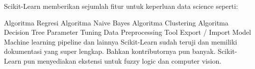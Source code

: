 \begin{enumerate}
Scikit-Learn memberikan sejumlah fitur untuk keperluan data science seperti:

Algoritma Regresi
Algoritma Naive Bayes
Algoritma Clustering
Algoritma Decision Tree
Parameter Tuning
Data Preprocessing Tool
Export / Import Model
Machine learning pipeline
dan lainnya
Scikit-Learn sudah teruji dan memiliki dokumentasi yang super lengkap. Bahkan kontributornya pun banyak. Scikit-Learn pun menyediakan ekstensi untuk fuzzy logic dan computer vision.

\end{enumerate}